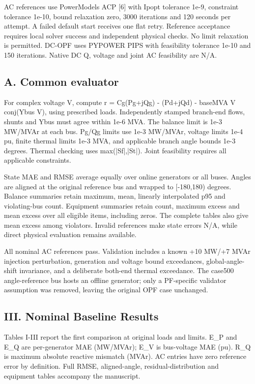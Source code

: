 \documentclass[conference]{IEEEtran}
\begin{document}
AC references use PowerModels ACP [6] with Ipopt tolerance 1e-9, constraint tolerance 1e-10, bound relaxation zero, 3000 iterations and 120 seconds per attempt. A failed default start receives one flat retry. Reference acceptance requires local solver success and independent physical checks. No limit relaxation is permitted. DC-OPF uses PYPOWER PIPS with feasibility tolerance 1e-10 and 150 iterations. Native DC Q, voltage and joint AC feasibility are N/A.

\subsection*{A. Common evaluator}
For complex voltage V, compute r = Cg(Pg+jQg) - (Pd+jQd) - baseMVA V conj(Ybus V), using prescribed loads. Independently stamped branch-end flows, shunts and Ybus must agree within 1e-6 MVA. The balance limit is 1e-3 MW/MVAr at each bus. Pg/Qg limits use 1e-3 MW/MVAr, voltage limits 1e-4 pu, finite thermal limits 1e-3 MVA, and applicable branch angle bounds 1e-3 degrees. Thermal checking uses max(|Sf|,|St|). Joint feasibility requires all applicable constraints.

State MAE and RMSE average equally over online generators or all buses. Angles are aligned at the original reference bus and wrapped to [-180,180) degrees. Balance summaries retain maximum, mean, linearly interpolated p95 and violating-bus count. Equipment summaries retain count, maximum excess and mean excess over all eligible items, including zeros. The complete tables also give mean excess among violators. Invalid references make state errors N/A, while direct physical evaluation remains available.

All nominal AC references pass. Validation includes a known +10 MW/+7 MVAr injection perturbation, generation and voltage bound exceedances, global-angle-shift invariance, and a deliberate both-end thermal exceedance. The case500 angle-reference bus hosts an offline generator; only a PF-specific validator assumption was removed, leaving the original OPF case unchanged.

\subsection*{III. Nominal Baseline Results}
Tables I-III report the first comparison at original loads and limits. E\_P and E\_Q are per-generator MAE (MW/MVAr); E\_V is bus-voltage MAE (pu). R\_Q is maximum absolute reactive mismatch (MVAr). AC entries have zero reference error by definition. Full RMSE, aligned-angle, residual-distribution and equipment tables accompany the manuscript.
\end{document}
